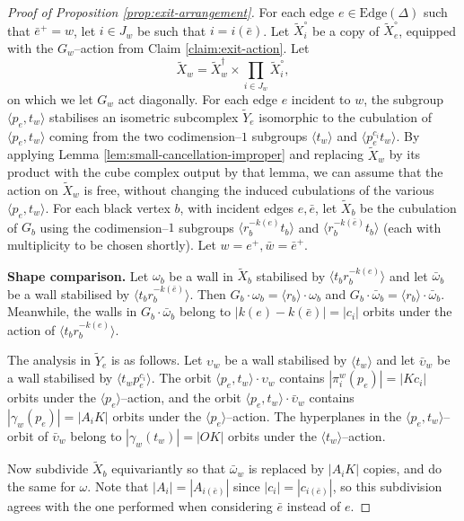 \documentclass[11pt,oneside]{amsart}
\theoremstyle{definition}
\newcommand{\edges}{\mathrm{Edge}}
\begin{document}
\begin{proof}[Proof of Proposition \ref{prop:exit-arrangement}]
For each edge $e\in\edges(\Delta)$ such that $\bar e^+=w$, let $i\in J_w$ be such that $i=i(\bar e)$.  Let $\widetilde X^\circ_i$ be a copy of $\widetilde X^\circ_{e}$, equipped with the $G_w$--action from Claim \ref{claim:exit-action}. Let $$\widetilde X_w=\widetilde X_w^\dagger\times \prod_{i\in J_w}\widetilde X^\circ_{i},$$ on which we let $G_w$ act diagonally.  For each edge $e$ incident to $w$, the subgroup $\langle p_e,t_w\rangle$ stabilises an isometric subcomplex $\widetilde Y_e$ isomorphic  to the cubulation of $\langle p_e,t_w\rangle$ coming from the two codimension--$1$ subgroups $\langle t_w\rangle$ and $\langle p_e^{c_i}t_w\rangle$.  By applying Lemma \ref{lem:small-cancellation-improper} and replacing $\widetilde X_w$ by its product with the cube complex output by that lemma, we can assume that the action on $\widetilde X_w$ is free, without changing the induced cubulations of the various $\langle p_e,t_w\rangle$.  For each black vertex $b$, with incident edges $e,\bar e$, let $\widetilde X_b$ be the cubulation of $G_b$ using the codimension--$1$ subgroups $\langle r_b^{-k(e)}t_b\rangle$ and $\langle r_b^{-k(\bar e)}t_b\rangle$ (each with multiplicity to be chosen shortly).  Let $w=e^+,\bar w=\bar e^+$.

\textbf{Shape comparison.}  Let $\omega_b$ be a wall in $\widetilde X_b$ stabilised by $\langle t_br_b^{-k(e)}\rangle$ and let $\bar\omega_b$ be a wall stabilised by $\langle t_br_b^{-k(\bar e)}\rangle$.  Then $G_b\cdot \omega_b=\langle r_b\rangle \cdot \omega_b$ and $G_b\cdot\bar\omega_b=\langle r_b\rangle\cdot \bar\omega_b$.  Meanwhile, the walls in $G_b\cdot \bar\omega_b$ belong to $|k(e)-k(\bar e)|=|c_i|$ orbits under the action of $\langle t_br_b^{-k(e)}\rangle$.

The analysis in $\widetilde Y_e$ is as follows.  Let $\upsilon_w$ be a wall stabilised by $\langle t_w\rangle$ and let $\bar\upsilon_w$ be a wall stabilised by $\langle t_wp_e^{c_i}\rangle$.  The orbit $\langle p_e,t_w\rangle\cdot \upsilon_w$ contains $|\pi_i^w(p_e)|=|Kc_i|$ orbits under the $\langle p_e\rangle$--action, and the orbit $\langle p_e,t_w\rangle\cdot \bar\upsilon_w$ contains $|\gamma_w(p_e)|=|A_iK|$ orbits under the $\langle p_e\rangle$--action.  The hyperplanes in the $\langle p_e,t_w\rangle$--orbit of $\bar\upsilon_w$ belong to $|\gamma_w(t_w)|=|OK|$ orbits under the $\langle t_w\rangle$--action.

Now subdivide $\widetilde X_b$ equivariantly so that $\bar\omega_w$ is replaced by $|A_iK|$ copies, and do the same for $\omega$.  Note that $|A_i|=|A_{i(\bar e)}|$ since $|c_i|=|c_{i(\bar e)}|$, so this subdivision agrees with the one performed when considering $\bar e$ instead of $e$.


\end{proof}
\end{document}
